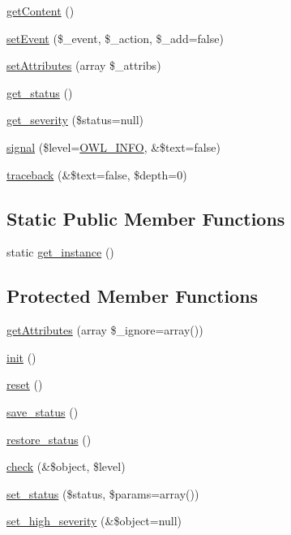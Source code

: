 \begin{DoxyCompactItemize}
\item 
\hyperlink{classBaseElement_af8c86b93bcdcfbc415bf96c622dc5516}{getContent} ()
\item 
\hyperlink{classBaseElement_ad5789f45f16aaa144716ee8558069c31}{setEvent} (\$\_\-event, \$\_\-action, \$\_\-add=false)
\item 
\hyperlink{classBaseElement_a7d8ddd64ceb3401a7cb84548656b3709}{setAttributes} (array \$\_\-attribs)
\item 
\hyperlink{class__OWL_a99ec771fa2c5c279f80152cc09e489a8}{get\_\-status} ()
\item 
\hyperlink{class__OWL_adf9509ef96858be7bdd9414c5ef129aa}{get\_\-severity} (\$status=null)
\item 
\hyperlink{class__OWL_a51ba4a16409acf2a2f61f286939091a5}{signal} (\$level=\hyperlink{owl_8severitycodes_8php_a139328861128689f2f4def6a399d9057}{OWL\_\-INFO}, \&\$text=false)
\item 
\hyperlink{class__OWL_aa29547995d6741b7d2b90c1d4ea99a13}{traceback} (\&\$text=false, \$depth=0)
\end{DoxyCompactItemize}
\subsection*{Static Public Member Functions}
\begin{DoxyCompactItemize}
\item 
static \hyperlink{classDocument_a840881b31974bd6f307fd6dcf73bc9c3}{get\_\-instance} ()
\end{DoxyCompactItemize}
\subsection*{Protected Member Functions}
\begin{DoxyCompactItemize}
\item 
\hyperlink{classBaseElement_a5cb9a5224e12b4d7017531ee5e2c9778}{getAttributes} (array \$\_\-ignore=array())
\item 
\hyperlink{class__OWL_ae0ef3ded56e8a6b34b6461e5a721cd3e}{init} ()
\item 
\hyperlink{class__OWL_a2f2a042bcf31965194c03033df0edc9b}{reset} ()
\item 
\hyperlink{class__OWL_a9e49b9c76fbc021b244c6915ea536d71}{save\_\-status} ()
\item 
\hyperlink{class__OWL_a465eeaf40edd9f9c848841700c32ce55}{restore\_\-status} ()
\item 
\hyperlink{class__OWL_ad6f4f6946f40199dd0333cf219fa500e}{check} (\&\$object, \$level)
\item 
\hyperlink{class__OWL_aea912d0ede9b3c2a69b79072d94d4787}{set\_\-status} (\$status, \$params=array())
\item 
\hyperlink{class__OWL_a576829692a3b66e3d518853bf43abae3}{set\_\-high\_\-severity} (\&\$object=null)
\end{DoxyCompactItemize}
